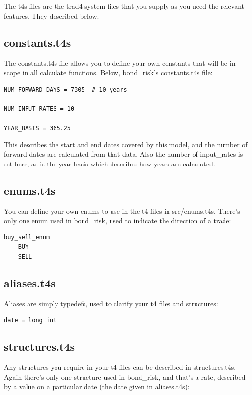 \documentclass{report}
\begin{document}
The t4s files are the trad4 system files that you supply as you need the relevant features. They described below.

\subsection{constants.t4s}

The constants.t4s file allows you to define your own constants that will be in scope in all calculate functions. Below, bond_risk's constants.t4s file:


\begin{verbatim}
NUM_FORWARD_DAYS = 7305  # 10 years

NUM_INPUT_RATES = 10

YEAR_BASIS = 365.25
\end{verbatim}

This describes the start and end dates covered by this model, and the number of forward dates are calculated from that data. Also the number of input_rates is set here, as is the year basis which describes how years are calculated.

\subsection{enums.t4s}

You can define your own enums to use in the t4 files in src/enums.t4s. There's only one enum used in bond_risk, used to indicate the direction of a trade:

\begin{verbatim}
buy_sell_enum
    BUY
    SELL
\end{verbatim}

\subsection{aliases.t4s}

Aliases are simply typedefs, used to clarify your t4 files and structures:

\begin{verbatim}
date = long int
\end{verbatim}

\subsection{structures.t4s}

Any structures you require in your t4 files can be described in structures.t4s. Again there's only one structure used in bond_risk, and that's a rate, described by a value on a particular date (the date given in aliases.t4s):
\end{document}
